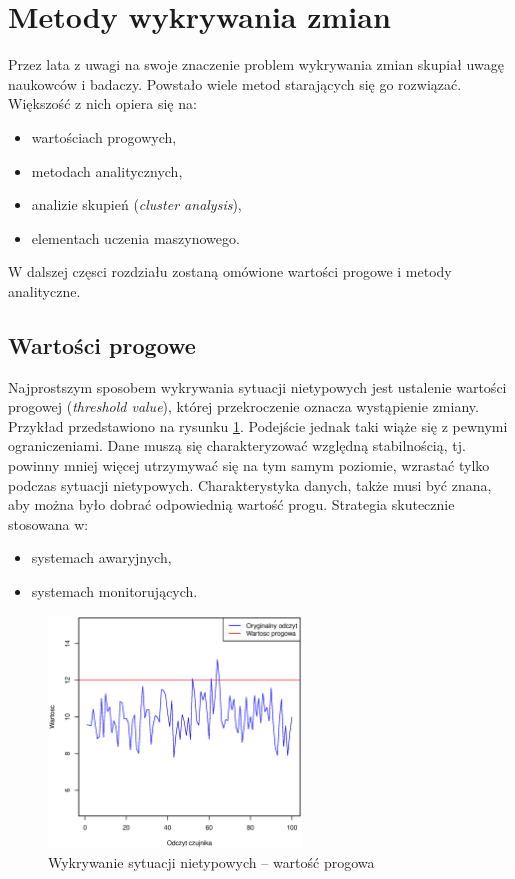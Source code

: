 
\section{Metody wykrywania zmian}
Przez lata z uwagi na swoje znaczenie problem wykrywania zmian skupiał uwagę naukowców i badaczy.
Powstało wiele metod starających się go rozwiązać.
Większość z nich opiera się na:
\begin{itemize}
  \item wartościach progowych,
  \item metodach analitycznych,
  \item analizie skupień (\textit{cluster analysis}),
  \item elementach uczenia maszynowego.
\end{itemize}
W dalszej częsci rozdziału zostaną omówione wartości progowe i metody analityczne.
\subsection{Wartości progowe}
Najprostszym sposobem wykrywania sytuacji nietypowych jest ustalenie wartości progowej (\textit{threshold value}),
której przekroczenie oznacza wystąpienie zmiany.
Przykład przedstawiono na rysunku \ref{fig:SignalThreshold}.
Podejście jednak taki wiąże się z pewnymi ograniczeniami.
Dane muszą się charakteryzować względną stabilnością,
tj. powinny mniej więcej utrzymywać się na tym samym poziomie, wzrastać tylko podczas sytuacji nietypowych.
Charakterystyka danych,
także musi być znana,
aby można było dobrać odpowiednią wartość progu.
Strategia skutecznie stosowana w:
\begin{itemize}
  \item systemach awaryjnych,
  \item systemach monitorujących.
\end{itemize}
\begin{figure}[htbp]
\centering
	\includegraphics[width=0.6\textwidth]{img/ch-2-threshold}
	\caption{Wykrywanie sytuacji nietypowych -- wartość progowa}
  \label{fig:SignalThreshold}
\end{figure}

